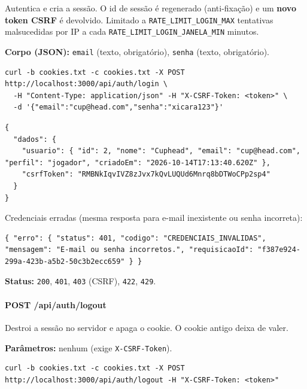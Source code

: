 Autentica e cria a sessão. O id de sessão é regenerado (anti-fixação) e
um \textbf{novo token CSRF} é devolvido. Limitado a
\texttt{RATE\_LIMIT\_LOGIN\_MAX} tentativas malsucedidas por IP a cada
\texttt{RATE\_LIMIT\_LOGIN\_JANELA\_MIN} minutos.

\textbf{Corpo (JSON):} \texttt{email} (texto, obrigatório),
\texttt{senha} (texto, obrigatório).

\begin{Verbatim}[breaklines,breakanywhere,fontsize=\scriptsize]
curl -b cookies.txt -c cookies.txt -X POST http://localhost:3000/api/auth/login \
  -H "Content-Type: application/json" -H "X-CSRF-Token: <token>" \
  -d '{"email":"cup@head.com","senha":"xicara123"}'
\end{Verbatim}

\begin{Verbatim}[breaklines,breakanywhere,fontsize=\scriptsize]
{
  "dados": {
    "usuario": { "id": 2, "nome": "Cuphead", "email": "cup@head.com", "perfil": "jogador", "criadoEm": "2026-10-14T17:13:40.620Z" },
    "csrfToken": "RMBNkIqvIVZ8zJvx7kQvLUQUd6Mnrq8bDTWoCPp2sp4"
  }
}
\end{Verbatim}

Credenciais erradas (mesma resposta para e-mail inexistente ou senha
incorreta):

\begin{Verbatim}[breaklines,breakanywhere,fontsize=\scriptsize]
{ "erro": { "status": 401, "codigo": "CREDENCIAIS_INVALIDAS", "mensagem": "E-mail ou senha incorretos.", "requisicaoId": "f387e924-299a-423b-a5b2-50c3b2ecc659" } }
\end{Verbatim}

\textbf{Status:} \texttt{200}, \texttt{401}, \texttt{403} (CSRF),
\texttt{422}, \texttt{429}.

\hypertarget{post-apiauthlogout}{%
\paragraph{POST /api/auth/logout}\label{post-apiauthlogout}}

Destroi a sessão no servidor e apaga o cookie. O cookie antigo deixa de
valer.

\textbf{Parâmetros:} nenhum (exige \texttt{X-CSRF-Token}).

\begin{Verbatim}[breaklines,breakanywhere,fontsize=\scriptsize]
curl -b cookies.txt -c cookies.txt -X POST http://localhost:3000/api/auth/logout -H "X-CSRF-Token: <token>"
\end{Verbatim}

